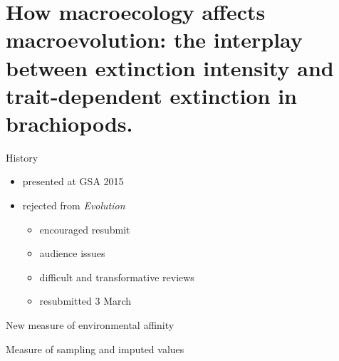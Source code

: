 \documentclass{beamer}
\title{}
\author{}
\institute{}
\date{}
\begin{document}
\begin{frame}
  \tableofcontents
\end{frame}


\section{How macroecology affects macroevolution: the interplay between extinction intensity and trait-dependent extinction in brachiopods.}

\begin{frame}
  \begin{block}{History}
    \begin{itemize}
      \item presented at GSA 2015
      \item rejected from \textit{Evolution}
        \begin{itemize}
          \item encouraged resubmit
          \item audience issues
          \item difficult and transformative reviews
          \item resubmitted 3 March
        \end{itemize}
    \end{itemize}
  \end{block}
\end{frame}

\begin{frame}
  \begin{block}{New measure of environmental affinity}
  \end{block}
\end{frame}

\begin{frame}
  \begin{block}{Measure of sampling and imputed values}

  \end{block}
\end{frame}
\end{document}
